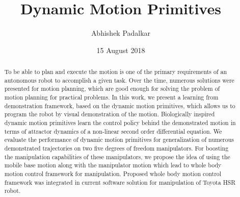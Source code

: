\documentclass[rnd]{mas_report}
\author{Abhishek Padalkar}
\title{Dynamic Motion Primitives}
\date{15 August 2018}
\begin{document}
\begin{titlepage}	
    \maketitle
\end{titlepage}


\pagestyle{plain}


\cleardoublepage
\statementpage

\begin{abstract}
To be able to plan and execute the motion is one of the primary requirements of an autonomous robot to accomplish a given task. Over the time, numerous solutions were presented for motion planning, which are good enough for solving the problem of motion planning for practical problems. In this work, we present a learning from demonstration framework, based on the dynamic motion primitives, which allows us to program the robot by visual demonstration of the motion. Biologically inspired dynamic motion primitives learn the control policy behind the demonstrated motion in terms of attractor dynamics of a non-linear second order differential equation. We evaluate the performance of dynamic motion primitives for generalization of numerous demonstrated trajectories on two five degrees of freedom manipulators. For boosting the manipulation capabilities of these manipulators, we propose the idea of using the mobile base motion along with the manipulator motion which lead to whole body motion control framework for manipulation. Proposed whole body motion control framework was integrated in current software solution for manipulation of Toyota HSR robot.   
\end{abstract}



\tableofcontents
\listoffigures
\listoftables


\mainmatter %

\pagestyle{mainmatter}






\end{document}
